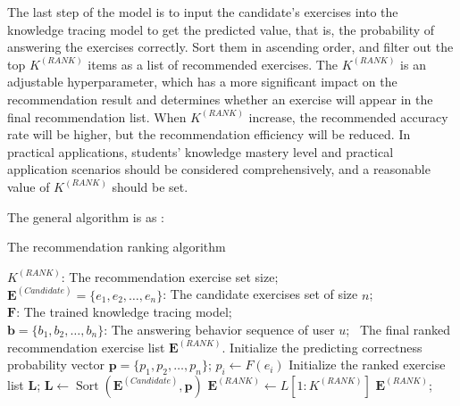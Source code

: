 The last step of the model is to input the candidate's exercises into the knowledge tracing model to get the predicted value, that is, the probability of answering the exercises correctly. Sort them in ascending order, and filter out the top \(K^{(RANK)}\) items as a list of recommended exercises. The \(K^{(RANK)}\) is an adjustable hyperparameter, which has a more significant impact on the recommendation result and determines whether an exercise will appear in the final recommendation list. When \(K^{(RANK)}\) increase, the recommended accuracy rate will be higher, but the recommendation efficiency will be reduced. In practical applications, students' knowledge mastery level and practical application scenarios should be considered comprehensively, and a reasonable value of \(K^{(RANK)}\) should be set.

The general algorithm is as \algoname{\ref{alg:ch4-Rank}}:
\begin{algorithm}[htbp!]
    \caption{The recommendation ranking algorithm}\label{alg:ch4-Rank}
    \begin{algorithmic}[1]
        \REQUIRE{}
        \(K^{(RANK)}\): The recommendation exercise set size;\\
        \(\mathbf{E}^{(Candidate)}=\{e_1,e_2,\ldots,e_n\} \): The candidate exercises set of size \(n\); \\
        \(\mathbf{F}\): The trained knowledge tracing model;\\
        \(\mathbf{b}=\{b_1,b_2,\ldots,b_n\} \): The answering behavior sequence of user \(u\);
        \ENSURE~The final ranked recommendation exercise list \(\mathbf{E}^{(RANK)} \). %
        \STATE{}
        \STATE{}Initialize the predicting correctness probability vector \(\mathbf{p}=\{p_1,p_2,\ldots,p_n\} \);
        \STATE{}\(p_i \leftarrow F(e_i)\)
        \ENDFOR{}
        \STATE{}
        \STATE{}Initialize the ranked exercise list \(\mathbf{L}\);
        \STATE{}\(\mathbf{L} \leftarrow \operatorname{Sort}(\mathbf{E}^{(Candidate)}, \mathbf{p})\)
        \STATE{}
        \STATE{}\(\mathbf{E}^{(RANK)} \leftarrow L[1:K^{(RANK)}]\)
        \RETURN{}\(\mathbf{E}^{(RANK)} \); %
    \end{algorithmic}
\end{algorithm}


